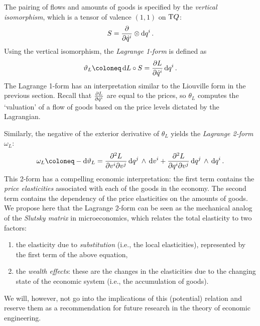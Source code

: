 The pairing of flows and amounts of goods is specified by the \emph{vertical isomorphism}, which is a tensor of valence \((1,1)\) on \(\mathrm{T}Q\): \cite{Carinena1990}
\begin{equation}
    S = \pdv{}{\dot{q}^i}\otimes \dd{q^i}.
\end{equation}
Using the vertical isomorphism, the \emph{Lagrange 1-form} is defined as
\begin{equation}
    \theta_L \coloneq \dd{L}\circ S = \pdv{L}{\dot{q}^i}\dd{q^i}.
\end{equation}
The Lagrange 1-form has an interpretation similar to the Liouville form in the previous section. Recall that \(\pdv{L}{\dot{q}^i}\) are equal to the prices, so \(\theta_L\) computes the `valuation' of a flow of goods based on the price levels dictated by the Lagrangian. 



Similarly, the negative of the exterior derivative of \(\theta_L\) yields the \emph{Lagrange 2-form} \(\omega_L\):
\begin{equation}
    \omega_L \coloneq -\dd{\theta_L} = \pdv[2]{L}{v^i}{v^j}\wedgep{\dd{q^j}}{\dd{v^i}} + \pdv[2]{L}{q^i}{v^j}\wedgep{\dd{q^j}}{\dd{q^i}}.
\end{equation}
This 2-form has a compelling economic interpretation: the first term contains the \emph{price elasticities} associated with each of the goods in the economy. The second term contains the dependency of the price elasticities on the amounts of goods.
We propose here that the Lagrange 2-form can be seen as the mechanical analog of the \emph{Slutsky matrix} in microeconomics, which relates the total elasticity to two factors: \cite{varianhalr1992}
\begin{enumerate}[label=(\roman*), noitemsep]
    \item the elasticity due to \emph{substitution} (i.e., the local elasticities), represented by the first term of the above equation, 
    \item the \emph{wealth effects}: these are the changes in the elasticities due to the changing state of the economic system (i.e., the accumulation of goods).
\end{enumerate}
We will, however, not go into the implications of this (potential) relation and reserve them as a recommendation for future research in the theory of economic engineering.


